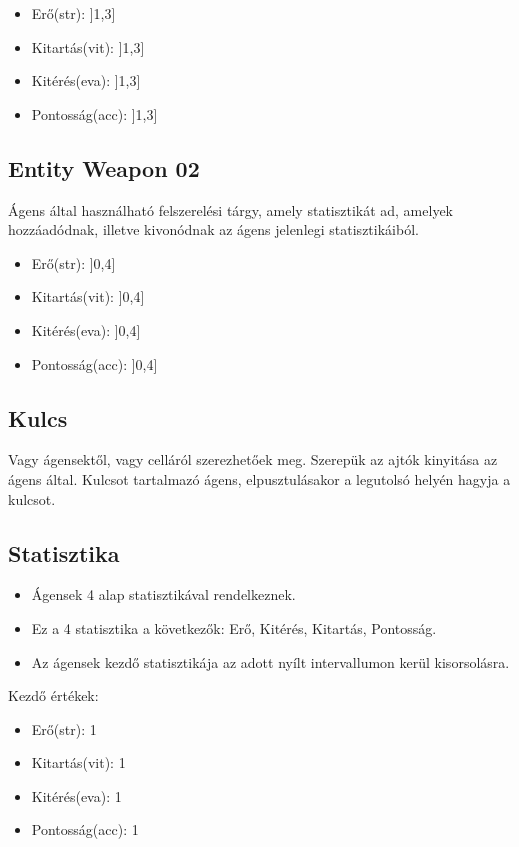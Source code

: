 \begin{itemize}
    \item Erő(str): ]1,3]
    \item Kitartás(vit): ]1,3]
    \item Kitérés(eva): ]1,3]
    \item Pontosság(acc): ]1,3]
\end{itemize}

\subsection{Entity Weapon 02}

Ágens által használható felszerelési tárgy, amely statisztikát ad, amelyek hozzáadódnak, illetve kivonódnak az ágens jelenlegi statisztikáiból.

\begin{itemize}
    \item Erő(str): ]0,4]
    \item Kitartás(vit): ]0,4]
    \item Kitérés(eva): ]0,4]
    \item Pontosság(acc): ]0,4]
\end{itemize}

\subsection{Kulcs}

Vagy ágensektől, vagy celláról szerezhetőek meg.
Szerepük az ajtók kinyitása az ágens által.
Kulcsot tartalmazó ágens, elpusztulásakor a legutolsó helyén hagyja a kulcsot.


\subsection{Statisztika}
\label{statisztika}
\begin{itemize}
    \item Ágensek 4 alap statisztikával rendelkeznek.
    \item Ez a 4 statisztika a következők: Erő, Kitérés, Kitartás, Pontosság.
    \item Az ágensek kezdő statisztikája az adott nyílt intervallumon kerül kisorsolásra.
\end{itemize}

\noindent Kezdő értékek:
\begin{itemize}
    \item Erő(str): 1
    \item Kitartás(vit): 1
    \item Kitérés(eva): 1
    \item Pontosság(acc): 1
\end{itemize}

